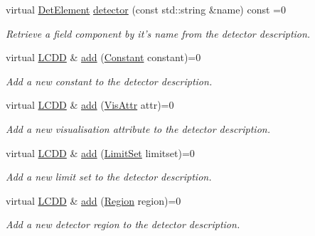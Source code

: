 \begin{DoxyCompactItemize}
virtual \hyperlink{class_d_d4hep_1_1_geometry_1_1_det_element}{DetElement} \hyperlink{class_d_d4hep_1_1_geometry_1_1_l_c_d_d_a0ed0c4e5d72a1e07ce11cf2592d6de3e}{detector} (const std::string \&name) const =0
\begin{DoxyCompactList}\small\item\em Retrieve a field component by it's name from the detector description. \item\end{DoxyCompactList}\item 
virtual \hyperlink{class_d_d4hep_1_1_geometry_1_1_l_c_d_d}{LCDD} \& \hyperlink{class_d_d4hep_1_1_geometry_1_1_l_c_d_d_a438cd36346d10c381b99bdfaa80ba50e}{add} (\hyperlink{class_d_d4hep_1_1_geometry_1_1_constant}{Constant} constant)=0
\begin{DoxyCompactList}\small\item\em Add a new constant to the detector description. \item\end{DoxyCompactList}\item 
virtual \hyperlink{class_d_d4hep_1_1_geometry_1_1_l_c_d_d}{LCDD} \& \hyperlink{class_d_d4hep_1_1_geometry_1_1_l_c_d_d_a4913f783de23fed9eb9dc11678226aa8}{add} (\hyperlink{class_d_d4hep_1_1_geometry_1_1_vis_attr}{VisAttr} attr)=0
\begin{DoxyCompactList}\small\item\em Add a new visualisation attribute to the detector description. \item\end{DoxyCompactList}\item 
virtual \hyperlink{class_d_d4hep_1_1_geometry_1_1_l_c_d_d}{LCDD} \& \hyperlink{class_d_d4hep_1_1_geometry_1_1_l_c_d_d_a2b6a8c58332d26518c9def51f1acbc0d}{add} (\hyperlink{class_d_d4hep_1_1_geometry_1_1_limit_set}{LimitSet} limitset)=0
\begin{DoxyCompactList}\small\item\em Add a new limit set to the detector description. \item\end{DoxyCompactList}\item 
virtual \hyperlink{class_d_d4hep_1_1_geometry_1_1_l_c_d_d}{LCDD} \& \hyperlink{class_d_d4hep_1_1_geometry_1_1_l_c_d_d_a618c1268be853682f6da33777aae71a8}{add} (\hyperlink{class_d_d4hep_1_1_geometry_1_1_region}{Region} region)=0
\begin{DoxyCompactList}\small\item\em Add a new detector region to the detector description. \item\end{DoxyCompactList}\item 

\end{DoxyCompactItemize}
